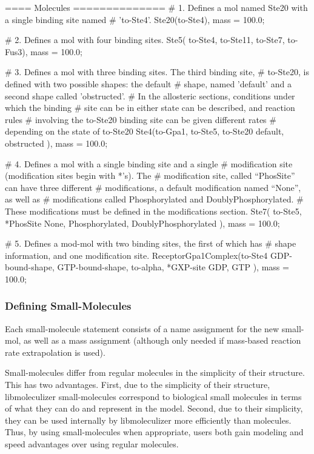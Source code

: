 \begin{ExampleMZR}[label=examplemodmolssec]
==== Molecules ==============
    # 1. Defines a mol named Ste20 with a single binding site named
    # 'to-Ste4'. 
    Ste20(to-Ste4),
        mass = 100.0;

    # 2. Defines a mol with four binding sites.
    Ste5( to-Ste4, to-Ste11, to-Ste7, to-Fus3),
         mass = 100.0;

    # 3. Defines a mol with three binding sites.  The third binding site,
    # to-Ste20, is defined with two possible shapes: the default
    # shape, named 'default' and a second shape called 'obstructed'.
    # In the allosteric sections, conditions under which the binding
    # site can be in either state can be described, and reaction rules
    # involving the to-Ste20 binding site can be given different rates
    # depending on the state of to-Ste20
    Ste4(to-Gpa1, to-Ste5, to-Ste20 { default, obstructed} ),
         mass = 100.0;

    # 4. Defines a mol with a single binding site and a single
    # modification site (modification sites begin with *'s). The
    # modification site, called ``PhosSite'' can have three different
    # modifications, a default modification named ``None'', as well as
    # modifications called Phosphorylated and DoublyPhosphorylated.
    # These modifications must be defined in the modifications section.
    Ste7( to-Ste5, *PhosSite { None, Phosphorylated, DoublyPhosphorylated } ),
         mass = 100.0;

    # 5. Defines a mod-mol with two binding sites, the first of which has
    # shape information, and one modification site.
    ReceptorGpa1Complex(to-Ste4 { GDP-bound-shape, GTP-bound-shape},  
                        to-alpha, *GXP-site { GDP, GTP} ), 
   	mass = 100.0;
\end{ExampleMZR}

\subsubsection{Defining Small-Molecules}
Each small-molecule statement consists of a name assignment for the new
small-mol, as well as a mass assignment (although only needed if
mass-based reaction rate extrapolation is used).  

Small-molecules differ from regular molecules in the simplicity of
their structure.  This has two advantages.  First, due to the
simplicity of their structure, libmoleculizer small-molecules
correspond to biological small molecules in terms of what they can do
and represent in the model.  Second, due to their simplicity, they can
be used internally by libmoleculizer more efficiently than molecules.
Thus, by using small-molecules when appropriate, users both gain
modeling and speed advantages over using regular molecules.  

